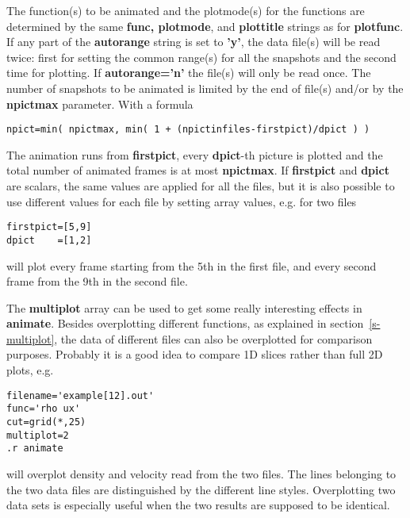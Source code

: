    The function(s) to be animated and the plotmode(s) for the functions 
   are determined by the same {\bf func, plotmode}, and {\bf plottitle} 
   strings as for {\bf plotfunc}. If any part of the 
   {\bf autorange} string is set to {\bf 'y'},
   the data file(s) will be read twice: first for setting the common range(s) 
   for all the snapshots and the second time for plotting.
   If {\bf autorange='n'} the file(s) will only be read once.
   The number of snapshots to be animated is limited by the end of 
   file(s) and/or by the {\bf npictmax} parameter. With a formula
\begin{verbatim}
npict=min( npictmax, min( 1 + (npictinfiles-firstpict)/dpict ) )
\end{verbatim}
   The animation runs from {\bf firstpict}, every {\bf dpict}-th picture is
   plotted and the total number of animated frames is at most {\bf npictmax}. 
   If {\bf firstpict} and {\bf dpict} are scalars, the same values are
   applied for all the files, but it is also possible to use different
   values for each file by setting array values, e.g. for two files
\begin{verbatim}
firstpict=[5,9]
dpict    =[1,2]
\end{verbatim}
   will plot every frame starting from the 5th in the first file,
   and every second frame from the 9th in the second file.

   The {\bf multiplot} array can be used to get some really interesting
   effects in {\bf animate}. Besides overplotting different functions,
   as explained in section~\ref{s-multiplot}, 
   the data of different files can also
   be overplotted for comparison purposes.
   Probably it is a good idea to compare 1D slices rather than full 2D plots,
   e.g. 
\begin{verbatim}
filename='example[12].out'
func='rho ux'
cut=grid(*,25)
multiplot=2
.r animate
\end{verbatim}
   will overplot density and velocity read from the two files. 
   The lines belonging to the two data files are distinguished by
   the different line styles. Overplotting two data sets is
   especially useful when the two results are supposed to be identical.

